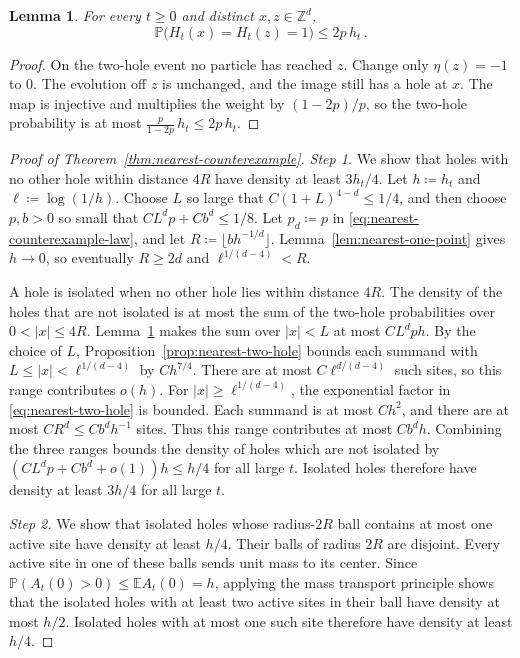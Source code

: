 \documentclass[11pt]{amsart}
\theoremstyle{plain}
\newtheorem{lemma}[theorem]{Lemma}
\theoremstyle{definition}
\newcommand{\Z}{\mathbb{Z}}
\newcommand{\E}{\mathbb{E}}
\renewcommand{\P}{\mathbb{P}}
\begin{document}
\begin{lemma}\label{lem:nearest-close-pair}
	For every $t\geq0$ and distinct $x,z\in\Z^d$,
	\begin{equation}\label{eq:nearest-close-pair}
		\P\bigl(H_t(x)=H_t(z)=1\bigr)\leq2p\,h_t\,.
	\end{equation}
\end{lemma}

\begin{proof}
	On the two-hole event no particle has reached $z$. Change only
	$\eta(z)=-1$ to $0$. The evolution off $z$ is unchanged, and the image
	still has a hole at $x$. The map is injective and multiplies the weight by
	$(1-2p)/p$, so the two-hole probability is at most
	$\frac p{1-2p}\,h_t\leq2p\,h_t$.
\end{proof}

\begin{proof}[Proof of Theorem~\ref{thm:nearest-counterexample}]
	\smallskip
	\noindent\emph{Step 1.} We show that holes with no other hole within
	distance $4R$ have density at least $3h_t/4$. Let $h\coloneqq h_t$ and
	$\ell\coloneqq\log(1/h)$. Choose $L$ so large that
	$C(1+L)^{4-d}\leq1/4$, and then choose $p,b>0$ so small that
	$CL^dp+Cb^d\leq1/8$. Let $p_d\coloneqq p$ in
	\eqref{eq:nearest-counterexample-law}, and let
	$R\coloneqq\lfloor bh^{-1/d}\rfloor$.
	Lemma~\ref{lem:nearest-one-point} gives $h\to0$,
	so eventually $R\geq2d$ and $\ell^{1/(d-4)}<R$.

	A hole is isolated when no other hole lies within distance $4R$. The
	density of the holes that are not isolated is at most the sum of the two-hole
	probabilities over $0<|x|\leq4R$. Lemma~\ref{lem:nearest-close-pair}
	makes the sum over $|x|<L$ at most $CL^dph$. By the choice of $L$,
	Proposition~\ref{prop:nearest-two-hole}
	bounds each summand with $L\leq|x|<\ell^{1/(d-4)}$ by $Ch^{7/4}$. There
	are at most $C\ell^{d/(d-4)}$ such sites, so this range contributes $o(h)$.
	For $|x|\geq\ell^{1/(d-4)}$, the exponential factor in
	\eqref{eq:nearest-two-hole} is bounded. Each summand is at most $Ch^2$, and
	there are at most $CR^d\leq Cb^dh^{-1}$ sites. Thus this range contributes at
	most $Cb^dh$. Combining the three ranges bounds the density of holes which are
	not isolated by $(CL^dp+Cb^d+o(1))h\leq h/4$ for all large $t$.
	Isolated holes therefore have density at least $3h/4$ for all large $t$.

	\smallskip
	\noindent\emph{Step 2.} We show that isolated holes whose radius-$2R$ ball
	contains at most one active site have density at least $h/4$.
	Their balls of radius $2R$ are disjoint. Every active site in one of these
	balls sends unit mass to its center. Since
	$\P(A_t(0)>0)\leq\E A_t(0)=h$, applying the mass transport principle shows that the isolated holes
	with at least two active sites in their ball have density at most $h/2$.
	Isolated holes with at most one
	such site therefore have density at least $h/4$.


\end{proof}
\end{document}
